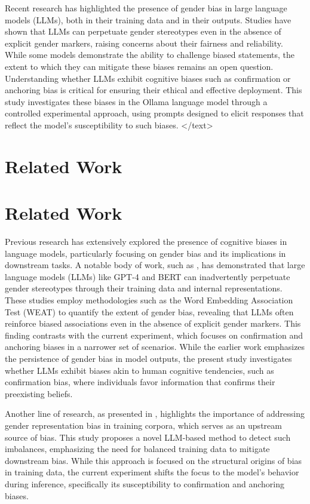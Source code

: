 \documentclass{article}
\begin{document}
Recent research has highlighted the presence of gender bias in large language models (LLMs), both in their training data and in their outputs. Studies have shown that LLMs can perpetuate gender stereotypes even in the absence of explicit gender markers, raising concerns about their fairness and reliability. While some models demonstrate the ability to challenge biased statements, the extent to which they can mitigate these biases remains an open question. Understanding whether LLMs exhibit cognitive biases such as confirmation or anchoring bias is critical for ensuring their ethical and effective deployment. This study investigates these biases in the Ollama language model through a controlled experimental approach, using prompts designed to elicit responses that reflect the model's susceptibility to such biases.
</text>
\section{Related Work}
\section{Related Work}

Previous research has extensively explored the presence of cognitive biases in language models, particularly focusing on gender bias and its implications in downstream tasks. A notable body of work, such as \cite{2410.19775v1}, has demonstrated that large language models (LLMs) like GPT-4 and BERT can inadvertently perpetuate gender stereotypes through their training data and internal representations. These studies employ methodologies such as the Word Embedding Association Test (WEAT) to quantify the extent of gender bias, revealing that LLMs often reinforce biased associations even in the absence of explicit gender markers. This finding contrasts with the current experiment, which focuses on confirmation and anchoring biases in a narrower set of scenarios. While the earlier work emphasizes the persistence of gender bias in model outputs, the present study investigates whether LLMs exhibit biases akin to human cognitive tendencies, such as confirmation bias, where individuals favor information that confirms their preexisting beliefs. 

Another line of research, as presented in \cite{2406.13677v3}, highlights the importance of addressing gender representation bias in training corpora, which serves as an upstream source of bias. This study proposes a novel LLM-based method to detect such imbalances, emphasizing the need for balanced training data to mitigate downstream bias. While this approach is focused on the structural origins of bias in training data, the current experiment shifts the focus to the model's behavior during inference, specifically its susceptibility to confirmation and anchoring biases. 
\end{document}
